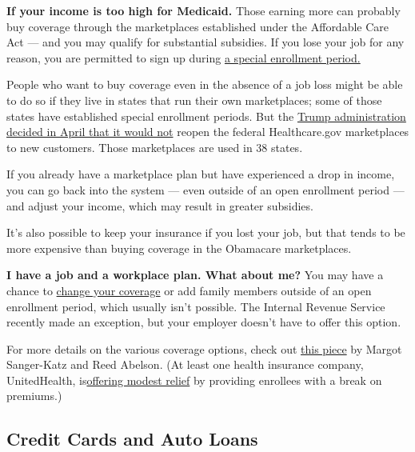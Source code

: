 \textbf{If your income is too high for Medicaid.} Those earning more can
probably buy coverage through the marketplaces established under the
Affordable Care Act --- and you may qualify for substantial subsidies.
If you lose your job for any reason, you are permitted to sign up during
\href{https://www.healthcare.gov/have-job-based-coverage/if-you-lose-job-based-coverage/}{a
special enrollment period.}

People who want to buy coverage even in the absence of a job loss might
be able to do so if they live in states that run their own marketplaces;
some of those states have established special enrollment periods. But
the
\href{https://www.nytimes3xbfgragh.onion/2020/04/01/upshot/obamacare-markets-coronavirus-trump.html}{Trump
administration decided in April that it would not} reopen the federal
Healthcare.gov marketplaces to new customers. Those marketplaces are
used in 38 states.

If you already have a marketplace plan but have experienced a drop in
income, you can go back into the system --- even outside of an open
enrollment period --- and adjust your income, which may result in
greater subsidies.

It's also possible to keep your insurance if you lost your job, but that
tends to be more expensive than buying coverage in the Obamacare
marketplaces.

\textbf{I have a job and a workplace plan. What about me?} You may have
a chance to
\href{https://www.nytimes3xbfgragh.onion/2020/05/12/business/employer-health-plans-coronavirus.html}{change
your coverage} or add family members outside of an open enrollment
period, which usually isn't possible. The Internal Revenue Service
recently made an exception, but your employer doesn't have to offer this
option.

For more details on the various coverage options, check out
\href{https://www.nytimes3xbfgragh.onion/2020/03/25/upshot/coronavirus-health-insurance-faq.html}{this
piece} by Margot Sanger-Katz and Reed Abelson. (At least one health
insurance company, UnitedHealth,
is\href{https://www.nytimes3xbfgragh.onion/2020/05/07/health/unitedhealth-coronavirus.html}{offering
modest relief} by providing enrollees with a break on premiums.)

\hypertarget{credit-cards-and-auto-loans}{%
\subsection{Credit Cards and Auto
Loans}\label{credit-cards-and-auto-loans}}

